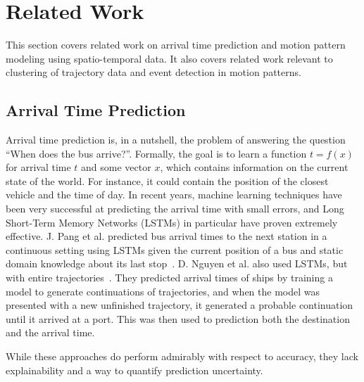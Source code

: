 \chapter{Related Work}
\label{cha:theory}

This section covers related work on arrival time prediction 
and motion pattern modeling using spatio-temporal data. It
also covers related work relevant to clustering of trajectory data
and event detection in motion patterns.

\section{Arrival Time Prediction}
Arrival time prediction is, in a nutshell, the problem of answering
the question ``When does the bus arrive?''. Formally, the goal is to
learn a function $t = f(x)$ for arrival time $t$ and some vector $x$, which
contains information on the current state of the world. For instance, it
could contain the position of the closest vehicle and the time of day.
In recent years, machine learning techniques have been very successful
at predicting the arrival time with small errors, and Long Short-Term 
Memory Networks (LSTMs) in particular have proven
extremely effective. J. Pang et al. predicted bus arrival times to the next station in a
continuous setting using LSTMs given the current position of a bus and static domain knowledge
about its last stop~\cite{pang2018learning}.
D. Nguyen et al. also used LSTMs, but with entire
trajectories~\cite{Nguyen2018Jun}. They predicted arrival times of
ships by training a model to generate continuations of trajectories, and  
when the model was presented with a new unfinished trajectory, it generated a
probable continuation until it arrived at a port. This was then used to
prediction both the destination and the arrival time.

While these approaches do perform admirably with respect to accuracy, 
they lack explainability and a way to quantify prediction uncertainty.

